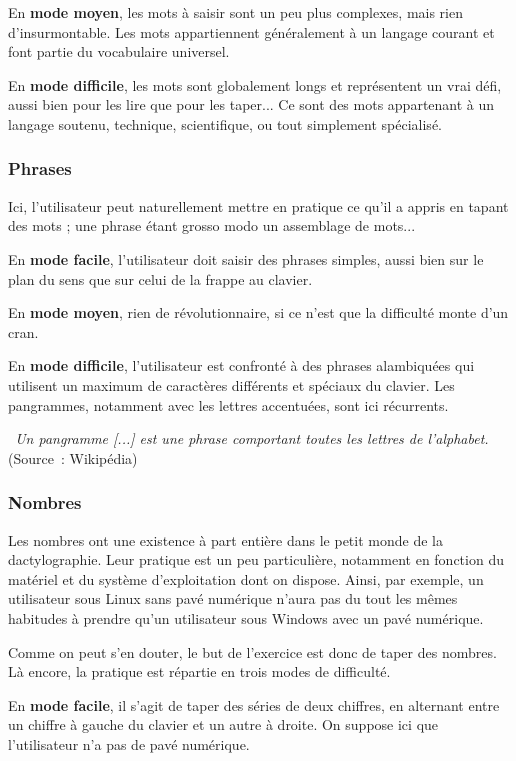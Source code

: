 \documentclass[a4paper,12pt]{article}
\begin{document}
En \textbf{mode moyen}, les mots à saisir sont un peu plus complexes, mais rien d'insurmontable. Les mots appartiennent généralement à un langage courant et font partie du vocabulaire universel.

En \textbf{mode difficile}, les mots sont globalement longs et représentent un vrai défi, aussi bien pour les lire que pour les taper... Ce sont des mots appartenant à un langage soutenu, technique, scientifique, ou tout simplement spécialisé.

\subsubsection{Phrases}

Ici, l'utilisateur peut naturellement mettre en pratique ce qu'il a appris en tapant des mots ; une phrase étant grosso modo un assemblage de mots...

En \textbf{mode facile}, l'utilisateur doit saisir des phrases simples, aussi bien sur le plan du sens que sur celui de la frappe au clavier.

En \textbf{mode moyen}, rien de révolutionnaire, si ce n'est que la difficulté monte d'un cran.

En \textbf{mode difficile}, l'utilisateur est confronté à des phrases alambiquées qui utilisent un maximum de caractères différents et spéciaux du clavier. Les pangrammes, notamment avec les lettres accentuées, sont ici récurrents.

\textit{\og~Un pangramme [...] est une phrase comportant toutes les lettres de l'alphabet.~\fg} (Source~: Wikipédia)

\subsubsection{Nombres}

Les nombres ont une existence à part entière dans le petit monde de la dactylographie. Leur pratique est un peu particulière, notamment en fonction du matériel et du système d'exploitation dont on dispose. Ainsi, par exemple, un utilisateur sous Linux sans pavé numérique n'aura pas du tout les mêmes habitudes à prendre qu'un utilisateur sous Windows avec un pavé numérique.

Comme on peut s'en douter, le but de l'exercice est donc de taper des nombres. Là encore, la pratique est répartie en trois modes de difficulté.

En \textbf{mode facile}, il s'agit de taper des séries de deux chiffres, en alternant entre un chiffre à gauche du clavier et un autre à droite. On suppose ici que l'utilisateur n'a pas de pavé numérique.
\end{document}
